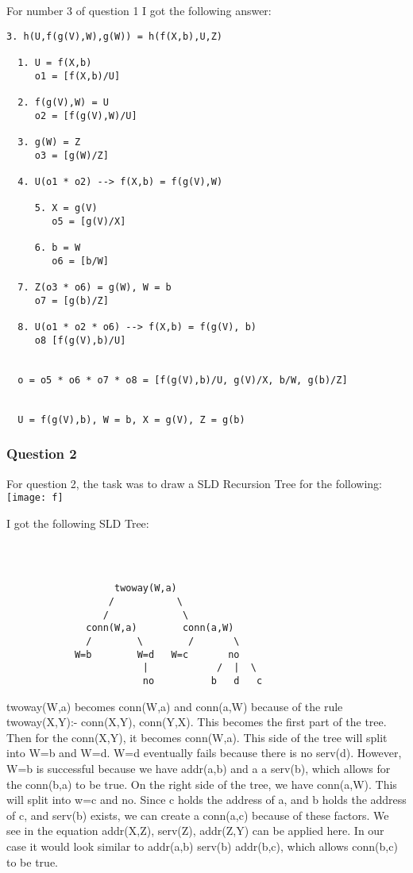 \documentclass{article}
\theoremstyle{theorem}
\theoremstyle{definition}
\theoremstyle{remark}
\begin{document}
\noindent\newline\newline For number 3 of question 1 I got the following answer:
\begin{verbatim}
3. h(U,f(g(V),W),g(W)) = h(f(X,b),U,Z)

  1. U = f(X,b)
     o1 = [f(X,b)/U]

  2. f(g(V),W) = U
     o2 = [f(g(V),W)/U]

  3. g(W) = Z
     o3 = [g(W)/Z]

  4. U(o1 * o2) --> f(X,b) = f(g(V),W)

     5. X = g(V)
        o5 = [g(V)/X]

     6. b = W
        o6 = [b/W]

  7. Z(o3 * o6) = g(W), W = b
     o7 = [g(b)/Z]

  8. U(o1 * o2 * o6) --> f(X,b) = f(g(V), b)
     o8 [f(g(V),b)/U]


  o = o5 * o6 * o7 * o8 = [f(g(V),b)/U, g(V)/X, b/W, g(b)/Z]


  U = f(g(V),b), W = b, X = g(V), Z = g(b)
\end{verbatim}

\subsubsection{Question 2}
For question 2, the task was to draw a SLD Recursion Tree for the following:\newline
\texttt{[image: f]}\newline\newline\newline

\noindent I got the following SLD Tree:
\begin{verbatim}



                   twoway(W,a)
                  /           \
                 /             \
              conn(W,a)        conn(a,W)
              /        \        /       \
            W=b        W=d   W=c       no
                        |            /  |  \
                        no          b   d   c
\end{verbatim}

\noindent\newline twoway(W,a) becomes conn(W,a) and conn(a,W) because of the rule twoway(X,Y):- conn(X,Y), conn(Y,X). This becomes the first part of the tree. Then for the conn(X,Y), it becomes conn(W,a). This side of the tree will split into W=b and W=d. W=d eventually fails because there is no serv(d). However, W=b is successful because we have addr(a,b) and a a serv(b), which allows for the conn(b,a) to be true. On the right side of the tree, we have conn(a,W). This will split into w=c and no. Since c holds the address of a, and b holds the address of c, and serv(b) exists, we can create a conn(a,c) because of these factors. We see in the equation addr(X,Z), serv(Z), addr(Z,Y) can be applied here. In our case it would look similar to addr(a,b) serv(b) addr(b,c), which allows conn(b,c) to be true.
\end{document}
